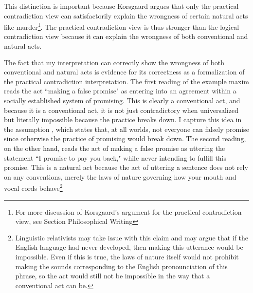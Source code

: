 \begin{isabellebody}
\begin{isamarkuptext}
This distinction is important because Korsgaard argues that only the practical contradiction view can 
satisfactorily explain the wrongness of certain natural acts like murder\footnote{For more discussion 
of Korsgaard's argument for the practical contradiction view, see Section Philosophical Writing}. 
The practical contradiction view is thus stronger than the logical contradiction view because it can 
explain the wrongness of both conventional and natural acts. 

The fact that my interpretation can correctly show the wrongness of both conventional and natural acts
is evidence for its correctness as a formalization of the practical contradiction interpretation. 
The first reading of the example maxim reads the act 
``making a false promise" as entering into an agreement within a socially established system of promising. 
This is clearly a conventional act, and because it is a conventional act, it is not just contradictory
when universalized but literally impossible because the practice breaks down. I capture this idea in the 
assumption , which states that, at all worlds, not everyone can falsely promise since 
otherwise the practice of promising would break down. The second reading, on the other hand, reads the 
act of making a false promise as uttering the statement ``I promise to pay you back," while never intending 
to fulfill this promise. This is a natural act because the act of uttering a sentence does not rely 
on any conventions, merely the laws of nature governing how your mouth and vocal cords behave\footnote{
Linguistic relativists may take issue with this claim and may argue that if the English language had 
never developed, then making this utterance would be impossible. Even if this is true, the laws of 
nature itself would not prohibit making the sounds corresponding to the English pronounciation of 
this phrase, so the act would still not be impossible in the way that a conventional act can be.} 


\end{isamarkuptext}
\end{isabellebody}
